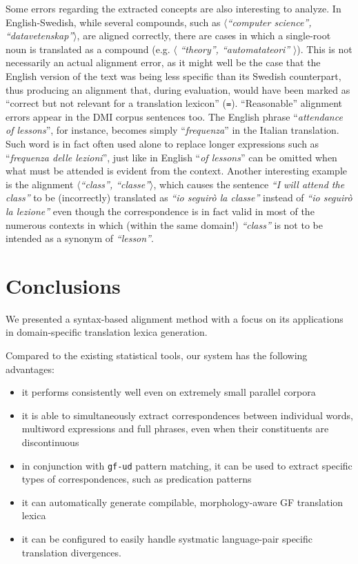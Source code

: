 \documentclass[11pt]{article}
\begin{document}
Some errors regarding the extracted concepts are also interesting to analyze.
In English-Swedish, while several compounds, such as $\langle$\textit{``computer science'', ``datavetenskap''}$\rangle$, are aligned correctly, there are cases in which a single-root noun is translated as a compound (e.g. $\langle$ \textit{``theory'', ``automatateori''} $\rangle$). 
This is not necessarily an actual alignment error, as it might well be the case that the English version of the text was being less specific than its Swedish counterpart, thus producing an alignment that, during evaluation, would have been marked as ``correct but not relevant for a translation lexicon'' (\texttt{=}). 
``Reasonable'' alignment errors appear in the DMI corpus sentences too. 
The English phrase ``\textit{attendance of lessons}'', for instance, becomes simply ``\textit{frequenza}'' in the Italian translation. 
Such word is in fact often used alone to replace longer expressions such as ``\textit{frequenza delle lezioni}'', just like in English ``\textit{of lessons}'' can be omitted when what must be attended is evident from the context.
Another interesting example is the alignment $\langle$\textit{``class'', ``classe''}$\rangle$, which causes the sentence \textit{``I will attend the class''} to be (incorrectly) translated as \textit{``io seguirò la classe''} instead of \textit{``io seguirò la lezione''} even though the correspondence is in fact valid in most of the numerous contexts in which (within the same domain!) \textit{``class''} is not to be intended as a synonym of \textit{``lesson''}.

\section{Conclusions} \label{conclusions}
We presented a syntax-based alignment method with a focus on its applications in domain-specific translation lexica generation.

Compared to the existing statistical tools, our system has the following advantages:
\begin{itemize}
  \item it performs consistently well even on extremely small parallel corpora
  \item it is able to simultaneously extract correspondences between individual words, multiword expressions and full phrases, even when their constituents are discontinuous
  \item in conjunction with \texttt{gf-ud} pattern matching, it can be used to extract specific types of correspondences, such as predication patterns  
  \item it can automatically generate compilable, morphology-aware GF translation lexica
  \item it can be configured to easily handle systmatic language-pair specific translation divergences.
\end{itemize}
\end{document}
